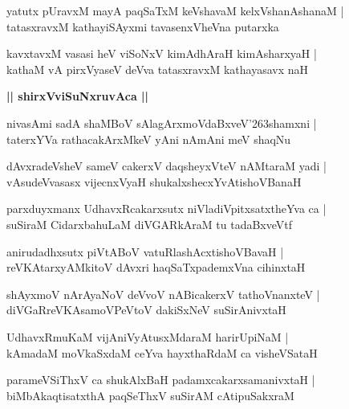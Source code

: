 \documentclass[twoside,12pt,openright]{book}
\def\S{\char'263}
\newcounter{shloka}[chapter]
\def\uvaca#1{\centerline{{\large\textbf{#1}}}}
\begin{document}
\begin{shloka}%
yatutx pUravxM mayA paqSaTxM keVshavaM kelxVshanAshanaM |\\
tatasxravxM kathayiSAyxmi tavasenxVheVna putarxka
\end{shloka}

\begin{shloka}%
kavxtavxM vasasi heV viSoNxV kimAdhAraH kimAsharxyaH |\\
kathaM vA pirxVyaseV deVva tatasxravxM kathayasavx naH 
\end{shloka}

\uvaca{|| shirxVviSuNxruvAca ||}

\begin{shloka}%
nivasAmi sadA shaMBoV sAlagArxmoVdaBxveV\S shamxni |\\
taterxYVa rathacakArxMkeV yAni nAmAni meV shaqNu
\end{shloka}

\begin{shloka}%
dAvxradeVsheV sameV cakerxV daqsheyxVteV nAMtaraM yadi |\\
vAsudeVvasasx vijecnxVyaH shukalxshecxYvAtishoVBanaH 
\end{shloka}

\begin{shloka}%
parxduyxmanx UdhavxRcakarxsutx niVladiVpitxsatxtheYva ca |\\
suSiraM CidarxbahuLaM diVGARkAraM tu tadaBxveVtf
\end{shloka}

\begin{shloka}%
anirudadhxsutx piVtABoV vatuRlashAcxtishoVBavaH |\\
reVKAtarxyAMkitoV dAvxri haqSaTxpademxVna cihinxtaH 
\end{shloka}

\begin{shloka}%
shAyxmoV nArAyaNoV deVvoV nABicakerxV tathoVnanxteV |\\
diVGaRreVKAsamoVPeVtoV dakiSxNeV suSirAnivxtaH 
\end{shloka}

\begin{shloka}%
UdhavxRmuKaM vijAniVyAtusxMdaraM harirUpiNaM |\\
kAmadaM moVkaSxdaM ceYva hayxthaRdaM ca visheVSataH 
\end{shloka}

\begin{shloka}%
parameVSiThxV ca shukAlxBaH padamxcakarxsamanivxtaH |\\
biMbAkaqtisatxthA paqSeThxV suSirAM cAtipuSakxraM 
\end{shloka}
\end{document}
